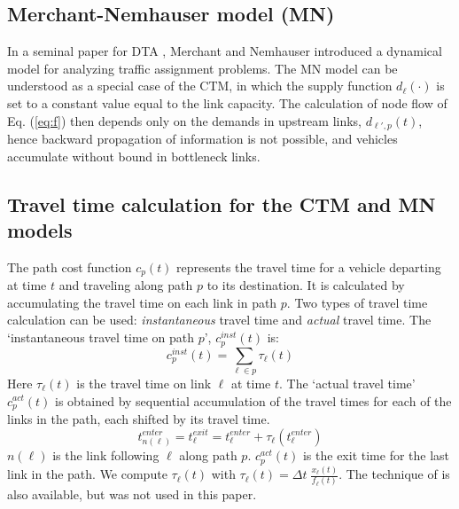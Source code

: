 \subsection{Merchant-Nemhauser model (MN)}
In a seminal paper for DTA \cite{merchant1978model, merchant1978optimality}, Merchant and Nemhauser introduced a dynamical model for analyzing traffic assignment problems. The MN model can be understood as a special case of the CTM, in which the supply function $d_\ell(\cdot)$ is set to a constant value equal to the link capacity. The calculation of node flow of Eq. (\ref{eq:f}) then depends only on the demands in upstream links, $d_{\ell',p}(t)$, hence backward propagation of information is not possible, and vehicles accumulate without bound in bottleneck links.

\subsection{Travel time calculation for the CTM and MN models}
The path cost function $c_p(t)$ represents the travel time for a vehicle departing at time $t$ and traveling along path $p$ to its destination. It is calculated by accumulating the travel time on each link in path $p$. Two types of travel time calculation can be used: \textit{instantaneous} travel time and \textit{actual} travel time. The `instantaneous travel time on path $p$', $c_p^{inst}(t)$ is:
\begin{equation}
c_p^{inst}(t) = \sum_{\ell\in p} \tau_\ell(t)
\end{equation}
Here $\tau_\ell(t)$ is the travel time on link $\ell$ at time $t$. The `actual travel time' $c_p^{act}(t)$ is obtained by sequential accumulation of the travel times for each of the links in the path, each shifted by its travel time.
\begin{equation}
t^{enter}_{n(\ell)} = t^{exit}_{\ell} = t^{enter}_{\ell} + \tau_{\ell}(t^{enter}_{\ell})
\end{equation}
$n(\ell)$ is the link following $\ell$ along path $p$.
$c_p^{act}(t)$ is the exit time for the last link in the path.
We compute $\tau_\ell(t)$ with $\tau_\ell(t) = \Delta t \; \frac{x_\ell(t)}{f_\ell(t)}$. The technique of \cite{newell1993simplified} is also available, but was not used in this paper.


